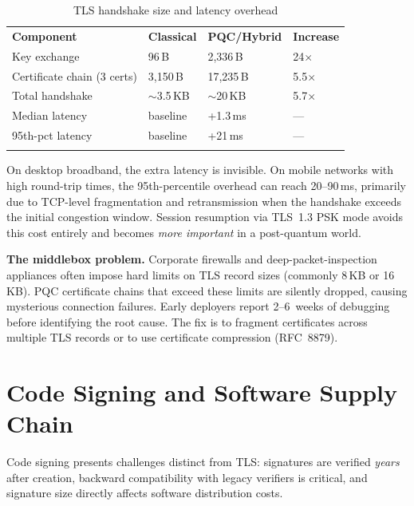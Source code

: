 \begin{table}[t]
\caption{TLS handshake size and latency overhead}
\label{tab:tls-overhead}
\begin{tabular}{p{4cm}p{2.5cm}p{2.5cm}p{2.5cm}}
\hline\noalign{\smallskip}
\textbf{Component} & \textbf{Classical} & \textbf{PQC/Hybrid} & \textbf{Increase} \\
\noalign{\smallskip}\svhline\noalign{\smallskip}
Key exchange & 96\,B & 2{,}336\,B & 24$\times$ \\
Certificate chain (3 certs) & 3{,}150\,B & 17{,}235\,B & 5.5$\times$ \\
Total handshake & $\sim$3.5\,KB & $\sim$20\,KB & 5.7$\times$ \\
Median latency & baseline & +1.3\,ms & --- \\
95th-pct latency & baseline & +21\,ms & --- \\
\noalign{\smallskip}\hline
\end{tabular}
\end{table}

On desktop broadband, the extra latency is invisible.  On mobile networks with high round-trip times, the 95th-percentile overhead can reach 20--90\,ms, primarily due to TCP-level fragmentation and retransmission when the handshake exceeds the initial congestion window.  Session resumption via TLS~1.3 PSK mode avoids this cost entirely and becomes \emph{more important} in a post-quantum world.

\begin{svgraybox}
\textbf{The middlebox problem.}  Corporate firewalls and deep-packet-inspection appliances often impose hard limits on TLS record sizes (commonly 8\,KB or 16\,KB).  PQC certificate chains that exceed these limits are silently dropped, causing mysterious connection failures.  Early deployers report 2--6~weeks of debugging before identifying the root cause.  The fix is to fragment certificates across multiple TLS records or to use certificate compression (RFC~8879).
\end{svgraybox}


\section{Code Signing and Software Supply Chain}
\label{sec:code-signing}

Code signing presents challenges distinct from TLS: signatures are verified \emph{years} after creation, backward compatibility with legacy verifiers is critical, and signature size directly affects software distribution costs.


